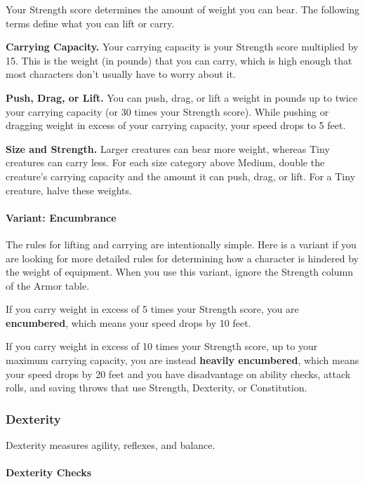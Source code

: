 \documentclass[
]{article}
\begin{document}
Your Strength score determines the amount of weight you can bear. The
following terms define what you can lift or carry.

\textbf{Carrying Capacity.} Your carrying capacity is your Strength
score multiplied by 15. This is the weight (in pounds) that you can
carry, which is high enough that most characters don't usually have to
worry about it.

\textbf{Push, Drag, or Lift.} You can push, drag, or lift a weight in
pounds up to twice your carrying capacity (or 30 times your Strength
score). While pushing or dragging weight in excess of your carrying
capacity, your speed drops to 5 feet.

\textbf{Size and Strength.} Larger creatures can bear more weight,
whereas Tiny creatures can carry less. For each size category above
Medium, double the creature's carrying capacity and the amount it can
push, drag, or lift. For a Tiny creature, halve these weights.

\hypertarget{variant-encumbrance}{%
\paragraph{Variant: Encumbrance}\label{variant-encumbrance}}

The rules for lifting and carrying are intentionally simple. Here is a
variant if you are looking for more detailed rules for determining how a
character is hindered by the weight of equipment. When you use this
variant, ignore the Strength column of the Armor table.

If you carry weight in excess of 5 times your Strength score, you are
\textbf{encumbered}, which means your speed drops by 10 feet.

If you carry weight in excess of 10 times your Strength score, up to
your maximum carrying capacity, you are instead \textbf{heavily
encumbered}, which means your speed drops by 20 feet and you have
disadvantage on ability checks, attack rolls, and saving throws that use
Strength, Dexterity, or Constitution.

\hypertarget{dexterity-1}{%
\subsubsection{Dexterity}\label{dexterity-1}}

Dexterity measures agility, reflexes, and balance.

\hypertarget{dexterity-checks}{%
\paragraph{Dexterity Checks}\label{dexterity-checks}}
\end{document}
